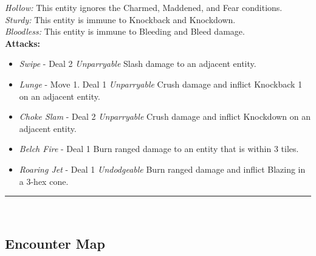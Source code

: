 \emph{Hollow:} This entity ignores the Charmed, Maddened, and Fear conditions.\\

\emph{Sturdy:} This entity is immune to Knockback and Knockdown.\\

\emph{Bloodless:} This entity is immune to Bleeding and Bleed damage.\\

\textbf{Attacks:}
\begin{itemize}
\item \emph{Swipe} -  Deal 2 \emph{Unparryable} Slash damage to an adjacent entity.
\item \emph{Lunge} - Move 1. Deal 1 \emph{Unparryable} Crush damage and inflict Knockback 1 on an adjacent entity.
\item \emph{Choke Slam} - Deal 2 \emph{Unparryable} Crush damage and inflict Knockdown on an adjacent entity.
\item \emph{Belch Fire} - Deal 1 Burn ranged damage to an entity that is within 3 tiles.
\item \emph{Roaring Jet} - Deal 1 \emph{Undodgeable} Burn ranged damage and inflict Blazing in a 3-hex cone.
\end{itemize}
\hrule
\ \\

\pagebreak

\subsection*{Encounter Map}
\begin{center}
\end{center}

